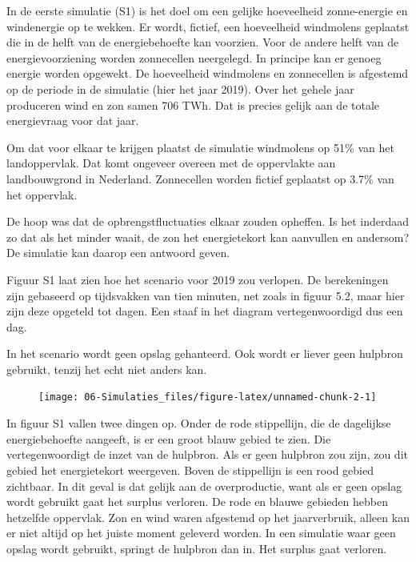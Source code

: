 \documentclass[
  11pt,
  a4paper,
]{book}
\begin{document}
In de eerste simulatie (S1) is het doel om een gelijke hoeveelheid zonne-energie en windenergie op te wekken. Er wordt, fictief, een hoeveelheid windmolens geplaatst die in de helft van de energiebehoefte kan voorzien. Voor de andere helft van de energievoorziening worden zonnecellen neergelegd. In principe kan er genoeg energie worden opgewekt. De hoeveelheid windmolens en zonnecellen is afgestemd op de periode in de simulatie (hier het jaar 2019). Over het gehele jaar produceren wind en zon samen 706 TWh. Dat is precies gelijk aan de totale energievraag voor dat jaar.

Om dat voor elkaar te krijgen plaatst de simulatie windmolens op 51\% van het landoppervlak. Dat komt ongeveer overeen met de oppervlakte aan landbouwgrond in Nederland. Zonnecellen worden fictief geplaatst op 3.7\% van het oppervlak.

De hoop was dat de opbrengstfluctuaties elkaar zouden opheffen. Is het inderdaad zo dat als het minder waait, de zon het energietekort kan aanvullen en andersom? De simulatie kan daarop een antwoord geven.

Figuur S1 laat zien hoe het scenario voor 2019 zou verlopen. De berekeningen zijn gebaseerd op tijdsvakken van tien minuten, net zoals in figuur 5.2, maar hier zijn deze opgeteld tot dagen. Een staaf in het diagram vertegenwoordigd dus een dag.

In het scenario wordt geen opslag gehanteerd. Ook wordt er liever geen hulpbron gebruikt, tenzij het echt niet anders kan.

\begin{figure}

{\centering \texttt{[image: 06-Simulaties\_files/figure-latex/unnamed-chunk-2-1]} 

}

\end{figure}

In figuur S1 vallen twee dingen op. Onder de rode stippellijn, die de dagelijkse energiebehoefte aangeeft, is er een groot blauw gebied te zien. Die vertegenwoordigt de inzet van de hulpbron. Als er geen hulpbron zou zijn, zou dit gebied het energietekort weergeven. Boven de stippellijn is een rood gebied zichtbaar. In dit geval is dat gelijk aan de overproductie, want als er geen opslag wordt gebruikt gaat het surplus verloren. De rode en blauwe gebieden hebben hetzelfde oppervlak. Zon en wind waren afgestemd op het jaarverbruik, alleen kan er niet altijd op het juiste moment geleverd worden. In een simulatie waar geen opslag wordt gebruikt, springt de hulpbron dan in. Het surplus gaat verloren.
\end{document}
